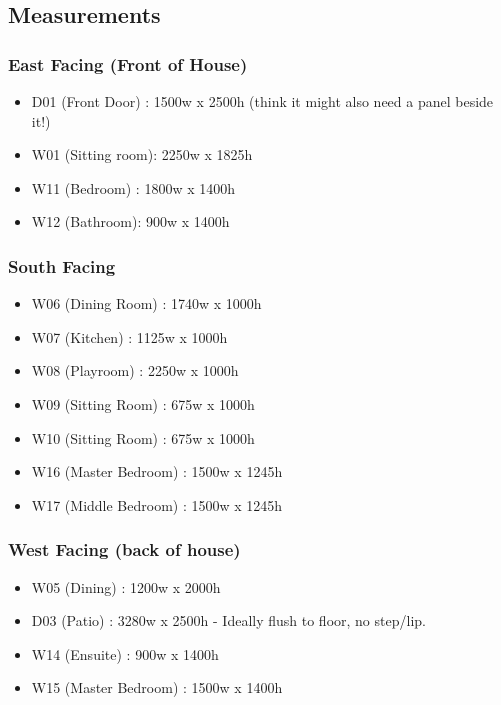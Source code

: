 \newcommand\B[1]{\textbf{\textcolor{red}{#1}}}


\subsection{Measurements}
\subsubsection{East Facing (Front of House)}
\begin{itemize}
\item D01 (Front Door) : 1500w x 2500h (think it might also need a panel beside it!)
\item W01 (Sitting room): 2250w x 1825h
\item W11 (Bedroom) : 1800w x 1400h
\item W12 (Bathroom): 900w x 1400h
\end{itemize}    
    
\subsubsection{South Facing}
\begin{itemize}
\item W06 (Dining Room) : 1740w x 1000h
\item W07 (Kitchen) : 1125w x 1000h
\item W08 (Playroom) : 2250w x 1000h
\item W09 (Sitting Room) : 675w x 1000h
\item W10 (Sitting Room) : 675w x 1000h
\item W16 (Master Bedroom) : 1500w x 1245h
\item W17 (Middle Bedroom) : 1500w x 1245h
\end{itemize}

\subsubsection{West Facing (back of house)}
\begin{itemize}
\item W05 (Dining) : 1200w x 2000h
\item D03 (Patio) : 3280w x 2500h  - Ideally flush to floor, no step/lip.
\item W14 (Ensuite) : 900w x 1400h
\item W15 (Master Bedroom) : 1500w x 1400h    
\end{itemize}

